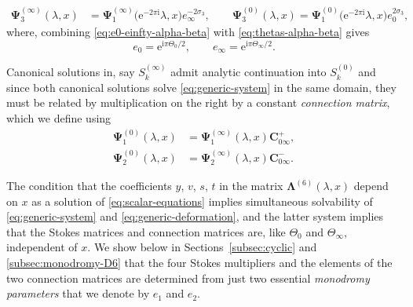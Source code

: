 \documentclass[pdftex]{sigma}
\numberwithin{equation}{section}
\newcommand{\ee}{\mathrm{e}}
\newcommand{\ii}{\mathrm{i}}
\begin{document}
\begin{align}%
\mathbf{\Psi}_3^{(\infty)}(\lambda, x) &= \mathbf{\Psi}_1^{(\infty)}\big(\ee^{-2\pi \ii} \lambda, x\big) e_\infty^{-2\sigma_3},
\qquad
\mathbf{\Psi}_3^{(0)}(\lambda, x) = \mathbf{\Psi}_1^{(0)}\big(\ee^{-2\pi \ii} \lambda, x\big) e_0^{2\sigma_3},\label{eq:stokes-condition-4}
\end{align}
where, combining \eqref{eq:e0-einfty-alpha-beta} with \eqref{eq:thetas-alpha-beta} gives
\begin{equation}
 e_0 = \ee^{\ii \pi \Theta_0/2},\qquad e_\infty = \ee^{\ii \pi \Theta_\infty/2}.
 \label{eq:e0-einfty}
\end{equation}

Canonical solutions in, say $S_k^{(\infty)}$ admit analytic continuation into $S_k^{(0)}$ and since both canonical solutions solve \eqref{eq:generic-system} in the same domain, they must be related by multiplication on the right by a constant \emph{connection matrix}, which we define using
\begin{align}
\label{eq:connection-matrix-1}\mathbf{\Psi}_1^{(0)}(\lambda, x) &= \mathbf{\Psi}_1^{(\infty)}(\lambda, x) \mathbf{C}_{0\infty}^+, \\
\label{eq:connection-matrix-2}\mathbf{\Psi}_2^{(0)}(\lambda, x) &= \mathbf{\Psi}_2^{(\infty)}(\lambda, x) \mathbf{C}_{0\infty}^-.
\end{align}

The condition that the coefficients $y$, $v$, $s$, $t$ in the matrix $\mathbf{\Lambda}^{(6)}(\lambda,x)$ depend on $x$ as a solution of \eqref{eq:scalar-equations} implies simultaneous solvability of \eqref{eq:generic-system} and \eqref{eq:generic-deformation}, and the latter system implies that the Stokes matrices and connection matrices are, like $\Theta_0$ and $\Theta_\infty$, independent of $x$. We show below in Sections~\ref{subsec:cyclic} and \ref{subsec:monodromy-D6} that the four Stokes multipliers and the elements of the two connection matrices are determined from just two essential \emph{monodromy parameters} that we denote by $e_1$ and $e_2$.
\end{document}
